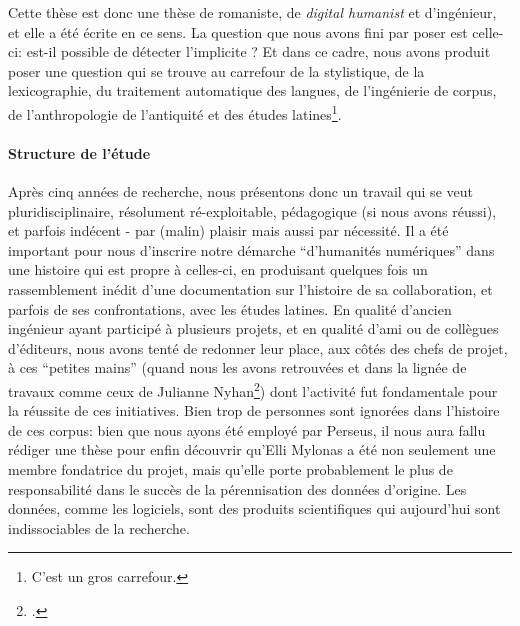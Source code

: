 Cette thèse est donc une thèse de romaniste, de \textit{digital humanist} et d'ingénieur, et elle a été écrite en ce sens. La question que nous avons fini par poser est celle-ci: est-il possible de détecter l'implicite ? Et dans ce cadre, nous avons produit poser une question qui se trouve au carrefour de la stylistique, de la lexicographie, du traitement automatique des langues, de l'ingénierie de corpus, de l'anthropologie de l'antiquité et des études latines\footnote{C'est un gros carrefour.}.



\paragraph{Structure de l'étude}

Après cinq années de recherche, nous présentons donc un travail qui se veut pluridisciplinaire, résolument ré-exploitable, pédagogique (si nous avons réussi), et parfois indécent - par (malin) plaisir mais aussi par nécessité. Il a été important pour nous d'inscrire notre démarche \enquote{d'humanités numériques} dans une histoire qui est propre à celles-ci, en produisant quelques fois un rassemblement inédit d'une documentation sur l'histoire de sa collaboration, et parfois de ses confrontations, avec les études latines. En qualité d'ancien ingénieur ayant participé à plusieurs projets, et en qualité d'ami ou de collègues d'éditeurs, nous avons tenté de redonner leur place, aux côtés des chefs de projet, à ces \enquote{petites mains} (quand nous les avons retrouvées et dans la lignée de travaux comme ceux de Julianne Nyhan\footcite{nyhan2017uncovering}) dont l'activité fut fondamentale pour la réussite de ces initiatives. Bien trop de personnes sont ignorées dans l'histoire de ces corpus: bien que nous ayons été employé par Perseus, il nous aura fallu rédiger une thèse pour enfin découvrir qu'Elli Mylonas a été non seulement une membre fondatrice du projet, mais qu'elle porte probablement le plus de responsabilité dans le succès de la pérennisation des données d'origine. Les données, comme les logiciels, sont des produits scientifiques qui aujourd'hui sont indissociables de la recherche.

